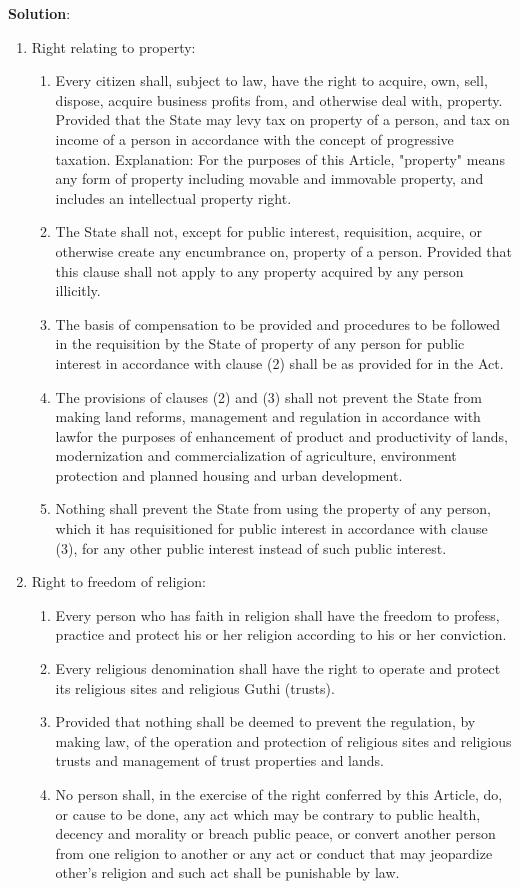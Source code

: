 \documentclass[
  openany]{book}
\newenvironment{solution}{ {\bfseries Solution}:}{}
\begin{document}
\begin{questions}
\begin{solution}
\begin{enumerate}
\item Right relating to property:
\begin{enumerate}
\item Every citizen shall, subject to law, have the right to acquire, own, sell, dispose, acquire business profits from, and otherwise deal with, property. Provided that the State may levy tax on property of a person, and tax on income of a person in accordance with the concept of progressive taxation. Explanation: For the purposes of this Article, "property" means any form of property including movable and immovable property, and includes an intellectual property right.
\item The State shall not, except for public interest, requisition, acquire, or otherwise create any encumbrance on, property of a person. Provided that this clause shall not apply to any property acquired by any person illicitly.
\item The basis of compensation to be provided and procedures to be followed in the requisition by the State of property of any person for public interest in accordance with clause (2) shall be as provided for in the Act.
\item The provisions of clauses (2) and (3) shall not prevent the State from making land reforms, management and regulation in accordance with lawfor the purposes of enhancement of product and productivity of lands, modernization and commercialization of agriculture, environment protection and planned housing and urban development.
\item Nothing shall prevent the State from using the property of any person, which it has requisitioned for public interest in accordance with clause (3), for any other public interest instead of such public interest.
\end{enumerate}

\item Right to freedom of religion:
\begin{enumerate}
\item Every person who has faith in religion shall have the freedom to profess, practice and protect his or her religion according to his or her conviction.
\item Every religious denomination shall have the right to operate and protect its religious sites and religious Guthi (trusts).
\item[] Provided that nothing shall be deemed to prevent the regulation, by making law, of the operation and protection of religious sites and religious trusts and management of trust properties and lands.
\item No person shall, in the exercise of the right conferred by this Article, do, or cause to be done, any act which may be contrary to public health, decency and morality or breach public peace, or convert another person from one religion to another or any act or conduct that may jeopardize other's religion and such act shall be punishable by law.
\end{enumerate}


\end{enumerate}
\end{solution}
\end{questions}
\end{document}
